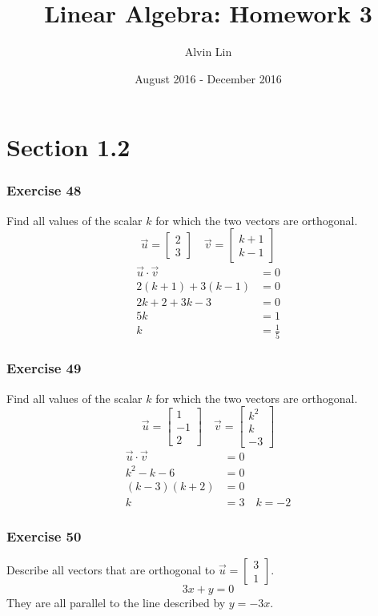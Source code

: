 \documentclass{math}
\title{Linear Algebra: Homework 3}
\author{Alvin Lin}
\date{August 2016 - December 2016}
\begin{document}
\maketitle

\section*{Section 1.2}

\subsubsection*{Exercise 48}
Find all values of the scalar \( k \) for which the two vectors are orthogonal.
\[ \vec{u} = \begin{bmatrix}2 \\ 3\end{bmatrix} \quad
  \vec{v} = \begin{bmatrix}k+1 \\ k-1\end{bmatrix} \]
\begin{align*}
  \vec{u}\cdot\vec{v} &= 0 \\
  2(k+1)+3(k-1) &= 0 \\
  2k+2+3k-3 &= 0 \\
  5k &= 1 \\
  k &= \frac{1}{5}
\end{align*}

\subsubsection*{Exercise 49}
Find all values of the scalar \( k \) for which the two vectors are orthogonal.
\[ \vec{u} = \begin{bmatrix}1 \\ -1 \\ 2\end{bmatrix} \quad
  \vec{v} = \begin{bmatrix}k^2 \\ k \\ -3\end{bmatrix} \]
\begin{align*}
  \vec{u}\cdot\vec{v} &= 0 \\
  k^2-k-6 &= 0 \\
  (k-3)(k+2) &= 0 \\
  k &= 3 \quad k = -2
\end{align*}

\subsubsection*{Exercise 50}
Describe all vectors that are orthogonal to \( \vec{u} = \begin{bmatrix}3 \\ 1
\end{bmatrix} \).
\[ 3x+y = 0 \]
They are all parallel to the line described by \( y = -3x \).
\end{document}
